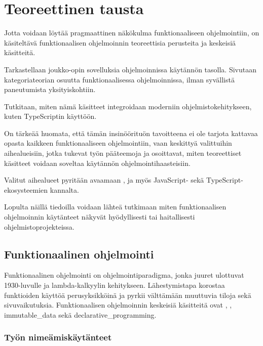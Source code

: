 \vspace{21.5pt}
\chapter{Teoreettinen tausta}

Jotta voidaan löytää pragmaattinen näkökulma funktionaaliseen ohjelmointiin, on käsiteltävä funktionaalisen ohjelmoinnin teoreettisia perusteita ja keskeisiä käsitteitä.

Tarkastellaan joukko-opin sovelluksia ohjelmoinnissa käytännön tasolla. Sivutaan kategoriateorian osuutta funktionaalisessa ohjelmoinnissa, ilman syvällistä paneutumista yksityiskohtiin.

Tutkitaan, miten nämä käsitteet integroidaan moderniin ohjelmistokehitykseen, kuten TypeScriptin käyttöön.

On tärkeää huomata, että tämän insinöörituön tavoitteena ei ole tarjota kattavaa opasta kaikkeen funktionaaliseen ohjelmointiin, vaan keskittyä valittuihin aihealueisiin, jotka tukevat työn pääteemoja ja osoittavat, miten teoreettiset käsitteet voidaan soveltaa käytännön ohjelmointihaasteisiin.

Valitut aihealueet pyritään avaamaan , ja myös JavaScript- sekä TypeScript-ekosysteemien kannalta.

Lopulta näillä tiedoilla voidaan lähteä tutkimaan miten funktionaalisen ohjelmoinnin käytänteet näkyvät hyödyllisesti tai haitallisesti ohjelmistoprojekteissa.

\section{Funktionaalinen ohjelmointi}

Funktionaalinen ohjelmointi on ohjelmointiparadigma, jonka juuret ulottuvat 1930-luvulle ja lambda-kalkyylin kehitykseen. Lähestymistapa korostaa funktioiden käyttöä perusyksikköinä ja pyrkii välttämään muuttuvia tiloja sekä sivuvaikutuksia. Funktionaalisen ohjelmoinnin keskeisiä käsitteitä ovat , , \gls{immutable_data} sekä \gls{declarative_programming}. \citep{Tan2004,computerphile_lambda}

\subsection{Työn nimeämiskäytänteet}

